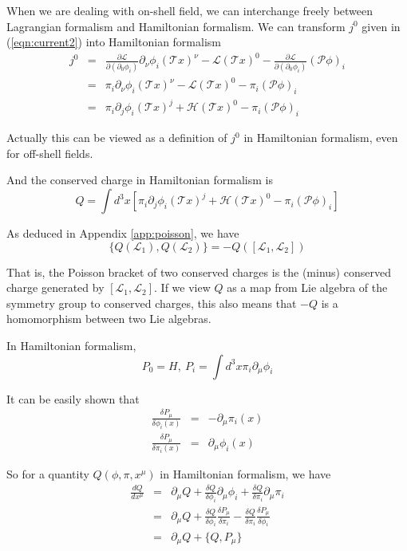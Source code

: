 \documentclass[12pt]{book}
\begin{document}
	When we are dealing with on-shell field, we can interchange freely between Lagrangian formalism and Hamiltonian formalism. We can transform $j^0$ given in (\ref{eqn:current2}) into Hamiltonian formalism
	\begin{eqnarray}
		j^0&=&\frac{\partial\mathcal{L}}{\partial(\partial_0\phi_i)}\partial_\nu\phi_i(\mathcal Tx)^\nu-\mathcal{L}(\mathcal Tx)^0-\frac{\partial\mathcal{L}}{\partial(\partial_0\phi_i)}(\mathcal P\phi)_i  \\
		&=&\pi_i\partial_\nu\phi_i(\mathcal Tx)^\nu-\mathcal{L}(\mathcal Tx)^0-\pi_i(\mathcal P\phi)_i  \\
		&=&\pi_i\partial_j\phi_i(\mathcal Tx)^j+\mathcal{H}(\mathcal Tx)^0-\pi_i(\mathcal P\phi)_i
	\end{eqnarray}
	
	Actually this can be viewed as a definition of $j^0$ in Hamiltonian formalism, even for off-shell fields.
	
	And the conserved charge in Hamiltonian formalism is
	\begin{equation}
		Q=\int d^3x[\pi_i\partial_j\phi_i(\mathcal Tx)^j+\mathcal{H}(\mathcal Tx)^0-\pi_i(\mathcal P\phi)_i] \label{eqn:charge-hami}
	\end{equation}
	
	As deduced in Appendix \ref{app:poisson}, we have
	\begin{equation}
		\{Q(\mathcal L_1),Q(\mathcal L_2)\}=-Q([\mathcal L_1,\mathcal L_2])
	\end{equation}
	
	That is, the Poisson bracket of two conserved charges is the (minus) conserved charge generated by $[\mathcal L_1,\mathcal L_2]$.  If we view $Q$ as a map from Lie algebra of the symmetry group to conserved charges, this also means that $-Q$ is a homomorphism between two Lie algebras.
	
	In Hamiltonian formalism,
	\begin{equation}
		P_0=H,\ P_i=\int d^3x \pi_i\partial_\mu\phi_i
	\end{equation}
	
	It can be easily shown that
	\begin{eqnarray}
		\frac{\delta P_\mu}{\delta\phi_i(x)}&=&-\partial_\mu\pi_i(x)\label{eqn:P_dir_phi}\\
		\frac{\delta P_\mu}{\delta\pi_i(x)}&=&\partial_\mu\phi_i(x)\label{eqn:P_dir_pi}
	\end{eqnarray}
	
	
	So for a quantity $Q(\phi,\pi,x^\mu)$ in Hamiltonian formalism, we have
	\begin{eqnarray}
		\frac{dQ}{dx^\mu}&=&\partial_\mu Q+\frac {\delta Q}{\delta \phi_i}\partial_\mu \phi_i +\frac {\delta Q}{\delta \pi_i}\partial_\mu \pi_i\\
		&=&\partial_\mu Q+\frac {\delta Q}{\delta \phi_i} \frac{\delta P_\mu}{\delta\pi_i} -\frac {\delta Q}{\delta \pi_i}\frac{\delta P_\mu}{\delta\phi_i}\\
		&=&\partial_\mu Q+\{Q,P_\mu\} \label{eqn:poisson-charge}
	\end{eqnarray}
	
\end{document}
